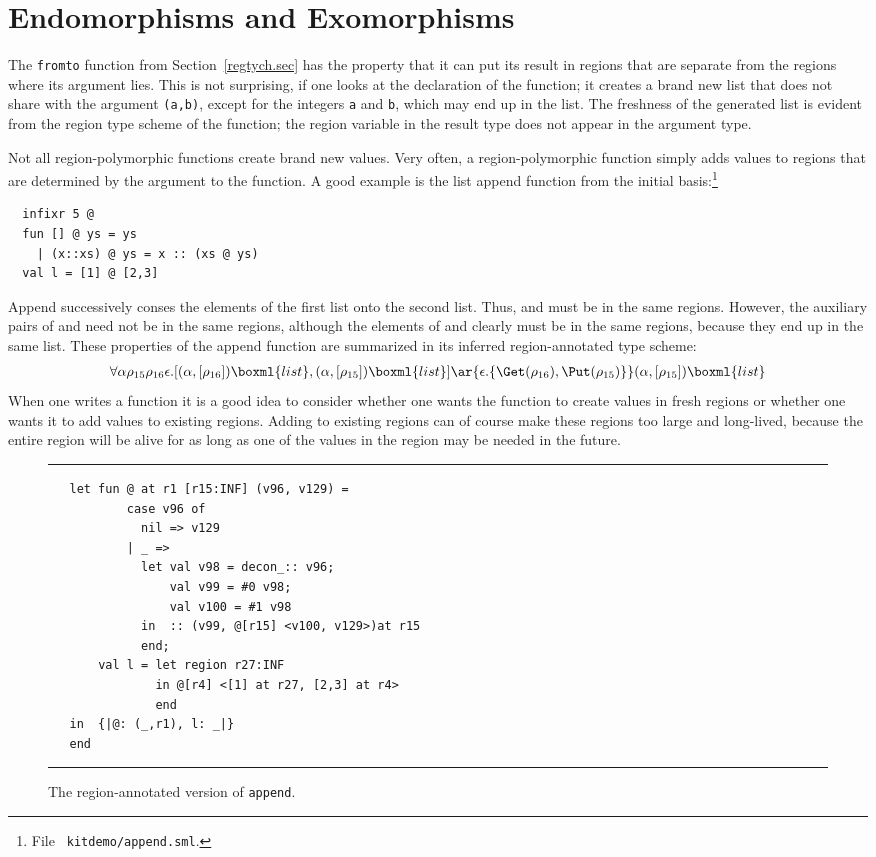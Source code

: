 \documentclass[12pt]{book}
\begin{document}
\section{Endomorphisms and Exomorphisms}
The {\tt fromto} function from Section~\ref{regtych.sec} has the
property that it can put its result in regions that are separate from
the regions where its argument lies. This is not surprising, if one
looks at the declaration of the function; it creates a brand new list
that does not share with the argument {\tt (a,b)}, except for the
integers {\tt a} and {\tt b}, which may end up in the list.  The
freshness of the generated list is evident from the region type scheme
of the function; the region variable in the result type does not
appear in the argument type.

Not all region-polymorphic functions create brand new values. Very
often, a region-polymorphic function simply adds values to regions
that are determined by the argument to the function. A good example is
the list append function from the initial basis:\footnote{File {\tt
    kitdemo/append.sml}.}
\begin{verbatim}
  infixr 5 @
  fun [] @ ys = ys
    | (x::xs) @ ys = x :: (xs @ ys)
  val l = [1] @ [2,3]
\end{verbatim}
Append successively conses the elements of the first list onto the
second list.  Thus,  and  must be in the same
regions. However, the auxiliary pairs of  and 
need not be in the same regions, although the elements of 
and  clearly must be in the same regions, because they end
up in the same list. These properties of the append function 
are summarized in its inferred region-annotated type scheme:
$$\begin{array}{c}\forall\alpha\rho_{15}\rho_{16}\epsilon.
   [ (\alpha,[\rho_{16}])\boxml{list},
      (\alpha,[\rho_{15}])\boxml{list} ]
\ar{\epsilon.\{\Get(\rho_{16}),\Put(\rho_{15})\}} (\alpha,[\rho_{15}])\boxml{list}\end{array}
$$
When one writes a function it is a good idea to consider whether one
wants the function to create values in fresh regions or whether one
wants it to add values to existing regions.  Adding to existing
regions can of course make these regions too large and long-lived,
because the entire region will be alive for as long as one of the
values in the region may be needed in the future.

\begin{figure}[htb]
\hrule
\medskip
\begin{verbatim}
   let fun @ at r1 [r15:INF] (v96, v129) =
           case v96 of
             nil => v129
           | _ =>
             let val v98 = decon_:: v96;
                 val v99 = #0 v98;
                 val v100 = #1 v98
             in  :: (v99, @[r15] <v100, v129>)at r15
             end;
       val l = let region r27:INF
               in @[r4] <[1] at r27, [2,3] at r4>
               end
   in  {|@: (_,r1), l: _|}
   end
\end{verbatim}
\caption{The region-annotated version of {\tt append}.}
\medskip
\hrule
\label{append.fig}
\end{figure}
\end{document}
